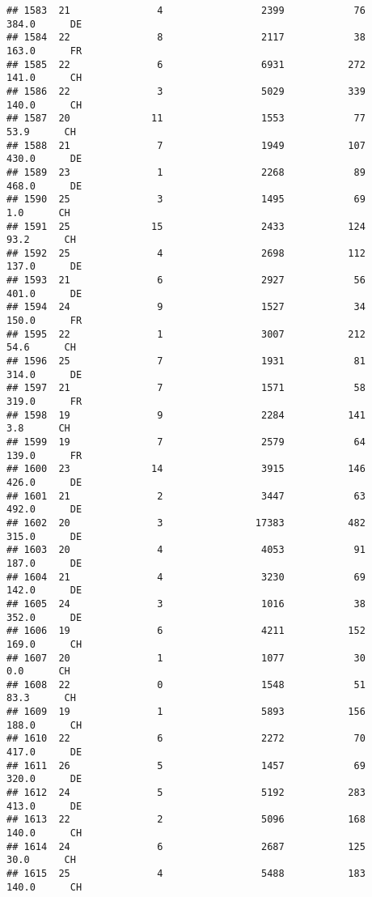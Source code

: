 \documentclass[
]{article}
\begin{document}
\begin{verbatim}
## 1583  21               4                 2399            76    384.0      DE
## 1584  22               8                 2117            38    163.0      FR
## 1585  22               6                 6931           272    141.0      CH
## 1586  22               3                 5029           339    140.0      CH
## 1587  20              11                 1553            77     53.9      CH
## 1588  21               7                 1949           107    430.0      DE
## 1589  23               1                 2268            89    468.0      DE
## 1590  25               3                 1495            69      1.0      CH
## 1591  25              15                 2433           124     93.2      CH
## 1592  25               4                 2698           112    137.0      DE
## 1593  21               6                 2927            56    401.0      DE
## 1594  24               9                 1527            34    150.0      FR
## 1595  22               1                 3007           212     54.6      CH
## 1596  25               7                 1931            81    314.0      DE
## 1597  21               7                 1571            58    319.0      FR
## 1598  19               9                 2284           141      3.8      CH
## 1599  19               7                 2579            64    139.0      FR
## 1600  23              14                 3915           146    426.0      DE
## 1601  21               2                 3447            63    492.0      DE
## 1602  20               3                17383           482    315.0      DE
## 1603  20               4                 4053            91    187.0      DE
## 1604  21               4                 3230            69    142.0      DE
## 1605  24               3                 1016            38    352.0      DE
## 1606  19               6                 4211           152    169.0      CH
## 1607  20               1                 1077            30      0.0      CH
## 1608  22               0                 1548            51     83.3      CH
## 1609  19               1                 5893           156    188.0      CH
## 1610  22               6                 2272            70    417.0      DE
## 1611  26               5                 1457            69    320.0      DE
## 1612  24               5                 5192           283    413.0      DE
## 1613  22               2                 5096           168    140.0      CH
## 1614  24               6                 2687           125     30.0      CH
## 1615  25               4                 5488           183    140.0      CH

\end{verbatim}
\end{document}
